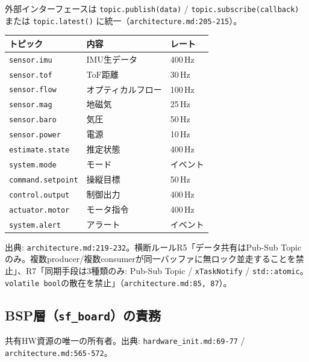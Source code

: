 \documentclass[a4paper,10pt]{ltjsarticle}
\begin{document}
外部インターフェースは \texttt{topic.publish(data)} / \texttt{topic.subscribe(callback)} または \texttt{topic.latest()} に統一（\texttt{architecture.md:205-215}）。

\begin{table}[h]
\centering\footnotesize
\begin{tabularx}{\textwidth}{@{}lYl@{}}
\toprule
トピック & 内容 & レート \\
\midrule
\texttt{sensor.imu} & IMU生データ & 400\,Hz \\
\texttt{sensor.tof} & ToF距離 & 30\,Hz \\
\texttt{sensor.flow} & オプティカルフロー & 100\,Hz \\
\texttt{sensor.mag} & 地磁気 & 25\,Hz \\
\texttt{sensor.baro} & 気圧 & 50\,Hz \\
\texttt{sensor.power} & 電源 & 10\,Hz \\
\texttt{estimate.state} & 推定状態 & 400\,Hz \\
\texttt{system.mode} & モード & イベント \\
\texttt{command.setpoint} & 操縦目標 & 50\,Hz \\
\texttt{control.output} & 制御出力 & 400\,Hz \\
\texttt{actuator.motor} & モータ指令 & 400\,Hz \\
\texttt{system.alert} & アラート & イベント \\
\bottomrule
\end{tabularx}
\end{table}

出典: \texttt{architecture.md:219-232}。横断ルールR5「データ共有はPub-Sub Topicのみ。複数producer/複数consumerが同一バッファに無ロック並走することを禁止」、R7「同期手段は3種類のみ: Pub-Sub Topic / \texttt{xTaskNotify} / \texttt{std::atomic}。\texttt{volatile bool}の散在を禁止」（\texttt{architecture.md:85, 87}）。

\subsection{BSP層（\texttt{sf\_board}）の責務}

共有HW資源の唯一の所有者。出典: \texttt{hardware\_init.md:69-77} / \texttt{architecture.md:565-572}。
\end{document}
